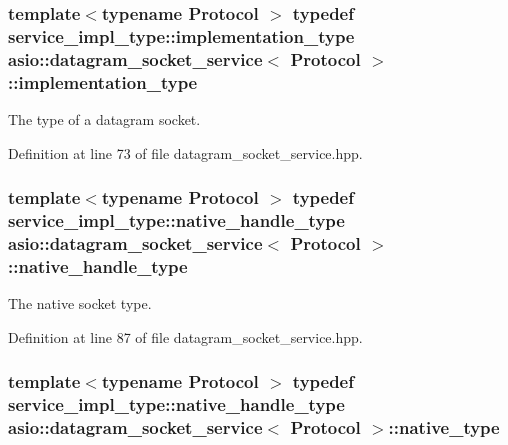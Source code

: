 \subsubsection[{implementation\+\_\+type}]{\setlength{\rightskip}{0pt plus 5cm}template$<$typename Protocol $>$ typedef {\bf service\+\_\+impl\+\_\+type\+::implementation\+\_\+type} {\bf asio\+::datagram\+\_\+socket\+\_\+service}$<$ Protocol $>$\+::{\bf implementation\+\_\+type}}\label{classasio_1_1datagram__socket__service_a41dcdc6b8a3500d6f88e10b6c08925cd}


The type of a datagram socket. 



Definition at line 73 of file datagram\+\_\+socket\+\_\+service.\+hpp.

\hypertarget{classasio_1_1datagram__socket__service_a78991c47ea915a16f6399d64e731ac07}{}
\subsubsection[{native\+\_\+handle\+\_\+type}]{\setlength{\rightskip}{0pt plus 5cm}template$<$typename Protocol $>$ typedef {\bf service\+\_\+impl\+\_\+type\+::native\+\_\+handle\+\_\+type} {\bf asio\+::datagram\+\_\+socket\+\_\+service}$<$ Protocol $>$\+::{\bf native\+\_\+handle\+\_\+type}}\label{classasio_1_1datagram__socket__service_a78991c47ea915a16f6399d64e731ac07}


The native socket type. 



Definition at line 87 of file datagram\+\_\+socket\+\_\+service.\+hpp.

\hypertarget{classasio_1_1datagram__socket__service_ab82ab07dd8513f35b991a03e3e386e9d}{}
\subsubsection[{native\+\_\+type}]{\setlength{\rightskip}{0pt plus 5cm}template$<$typename Protocol $>$ typedef {\bf service\+\_\+impl\+\_\+type\+::native\+\_\+handle\+\_\+type} {\bf asio\+::datagram\+\_\+socket\+\_\+service}$<$ Protocol $>$\+::{\bf native\+\_\+type}}\label{classasio_1_1datagram__socket__service_ab82ab07dd8513f35b991a03e3e386e9d}


